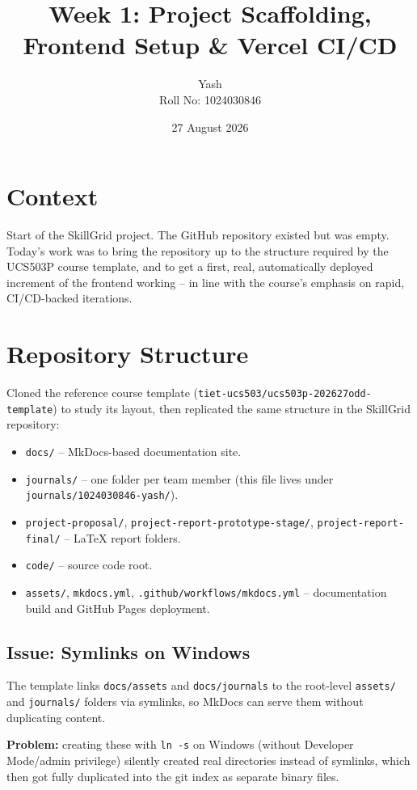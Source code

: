 \documentclass[11pt,a4paper]{article}
\title{\bfseries Week 1: Project Scaffolding, Frontend
  Setup \& Vercel CI/CD}
\author{Yash \\ \small Roll No: 1024030846}
\date{27 August 2026}
\begin{document}
\maketitle

\section{Context}
Start of the SkillGrid project. The GitHub repository
existed but was empty. Today's work was to bring the
repository up to the structure required by the UCS503P
course template, and to get a first, real, automatically
deployed increment of the frontend working -- in line
with the course's emphasis on rapid, CI/CD-backed
iterations.

\section{Repository Structure}
Cloned the reference course template
(\texttt{tiet-ucs503/ucs503p-202627odd-template}) to
study its layout, then replicated the same structure in
the SkillGrid repository:

\begin{itemize}[leftmargin=0.7cm]
  \item \texttt{docs/} -- MkDocs-based documentation site.
  \item \texttt{journals/} -- one folder per team member
    (this file lives under \texttt{journals/1024030846-yash/}).
  \item \texttt{project-proposal/},
    \texttt{project-report-prototype-stage/},
    \texttt{project-report-final/} -- LaTeX report folders.
  \item \texttt{code/} -- source code root.
  \item \texttt{assets/}, \texttt{mkdocs.yml},
    \texttt{.github/workflows/mkdocs.yml} -- documentation
    build and GitHub Pages deployment.
\end{itemize}

\subsection{Issue: Symlinks on Windows}
The template links \texttt{docs/assets} and
\texttt{docs/journals} to the root-level
\texttt{assets/} and \texttt{journals/} folders via
symlinks, so MkDocs can serve them without duplicating
content.

\textbf{Problem:} creating these with \texttt{ln -s} on
Windows (without Developer Mode/admin privilege) silently
created real directories instead of symlinks, which then
got fully duplicated into the git index as separate
binary files.
\end{document}
